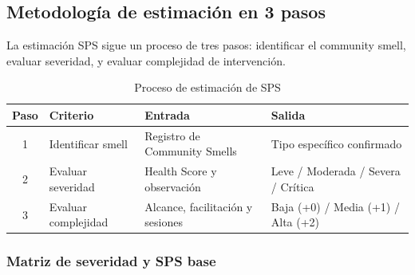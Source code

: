 \subsection{Metodología de estimación en 3 pasos}

La estimación SPS sigue un proceso de tres pasos: identificar el community smell, evaluar severidad, y evaluar complejidad de intervención.

\begin{table}[h]
    \centering
    \small
    \begin{tabularx}{\textwidth}{|c|X|X|X|}
        \hline
        \textbf{Paso} & \textbf{Criterio}   & \textbf{Entrada}                 & \textbf{Salida}                    \\
        \hline
        1             & Identificar smell   & Registro de Community Smells     & Tipo específico confirmado         \\
        \hline
        2             & Evaluar severidad   & Health Score y observación       & Leve / Moderada / Severa / Crítica \\
        \hline
        3             & Evaluar complejidad & Alcance, facilitación y sesiones & Baja (+0) / Media (+1) / Alta (+2) \\
        \hline
    \end{tabularx}
    \caption{Proceso de estimación de SPS}
    \label{tab:proceso-sps}
\end{table}
\FloatBarrier

\subsubsection{Matriz de severidad y SPS base}

